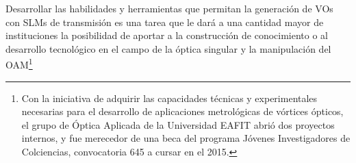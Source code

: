 Desarrollar las habilidades y herramientas que permitan la generación
de VOs con SLMs de transmisión es una tarea que le dará a una cantidad
mayor de instituciones la posibilidad de aportar a la construcción de
conocimiento o al desarrollo tecnológico en el campo de la óptica
singular y la manipulación del OAM\footnote{Con la iniciativa de adquirir las capacidades técnicas y experimentales
necesarias para el desarrollo de aplicaciones metrológicas de vórtices
ópticos, el grupo de Óptica Aplicada de la Universidad EAFIT
abrió dos proyectos internos, y fue merecedor de una beca del programa Jóvenes Investigadores de Colciencias,
convocatoria 645 a cursar en el 2015.}




